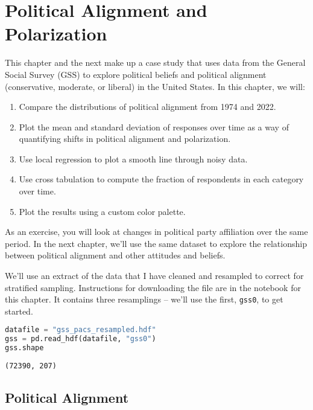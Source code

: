 \hypertarget{political-alignment-and-polarization}{%
\chapter{Political Alignment and
Polarization}\label{political-alignment-and-polarization}}

This chapter and the next make up a case study that uses data from the
General Social Survey (GSS) to explore political beliefs and political
alignment (conservative, moderate, or liberal) in the United States. In
this chapter, we will:

\begin{enumerate}
\def\labelenumi{\arabic{enumi}.}
\item
  Compare the distributions of political alignment from 1974 and 2022.
\item
  Plot the mean and standard deviation of responses over time as a way
  of quantifying shifts in political alignment and polarization.
\item
  Use local regression to plot a smooth line through noisy data.
\item
  Use cross tabulation to compute the fraction of respondents in each
  category over time.
\item
  Plot the results using a custom color palette.
\end{enumerate}

As an exercise, you will look at changes in political party affiliation
over the same period. In the next chapter, we'll use the same dataset to
explore the relationship between political alignment and other attitudes
and beliefs.

We'll use an extract of the data that I have cleaned and resampled to
correct for stratified sampling. Instructions for downloading the file
are in the notebook for this chapter. It contains three resamplings --
we'll use the first, \passthrough{\lstinline!gss0!}, to get started.

\begin{lstlisting}[language=Python,style=source]
datafile = "gss_pacs_resampled.hdf"
gss = pd.read_hdf(datafile, "gss0")
gss.shape
\end{lstlisting}

\begin{lstlisting}[style=output]
(72390, 207)
\end{lstlisting}

\hypertarget{political-alignment}{%
\section{Political Alignment}\label{political-alignment}}

